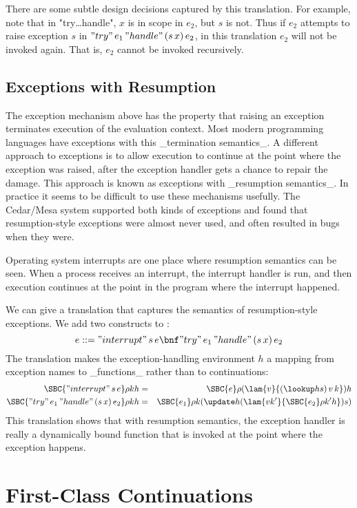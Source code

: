 There are some subtle design decisions captured by this translation. For example, note that in "try\ldots handle", $x$ is in scope in $e_2$, but $s$ is not. Thus if $e_2$ attempts to raise exception $s$ in $"try"\,e_1\,"handle"\,(s\,x)\,e_2$, in this translation $e_2$ will not be invoked again. That is, $e_2$ cannot be invoked recursively.

\subsection{Exceptions with Resumption}

The exception mechanism above has the property that raising an exception
terminates execution of the evaluation context. Most modern programming
languages have exceptions with this _termination semantics_. A different
approach to exceptions is to allow execution to continue at the point
where the exception was raised, after the exception handler gets a
chance to repair the damage. This approach is known as exceptions with
_resumption semantics_. In practice it seems to be difficult to use
these mechanisms usefully. The Cedar/Mesa system supported both kinds
of exceptions and found that resumption-style exceptions were almost
never used, and often resulted in bugs when they were.

Operating system interrupts are one place where resumption semantics can
be seen. When a process receives an interrupt, the interrupt handler is
run, and then execution continues at the point in the program where the
interrupt happened.

We can give a translation that captures the semantics of
resumption-style exceptions. We add two constructs to \FL:
\[
 e ::= "interrupt"\,s\,e \bnf "try"\,e_1\,"handle"\,(s\,x)\,e_2
\]
The translation makes the exception-handling environment $h$ a mapping
from exception names to _functions_ rather than to continuations:
\begin{eqnarray*}
\SBC{"interrupt"\,s\,e}\rho kh &=& \SBC{e}\rho{(\lam{v}{(\lookup h s)\,v\,k})}h\\
\SBC{"try"\,e_1\,"handle"\,(s\,x)\,e_2}\rho kh &=& \SBC{e_1}\rho k{(\update h{(\lam{vk'}{\SBC{e_2}\rho{k'}h})}s)}
\end{eqnarray*}
\noindent This translation shows that with resumption semantics,
the exception handler is really a dynamically bound function that is
invoked at the point where the exception happens.

\section{First-Class Continuations}

